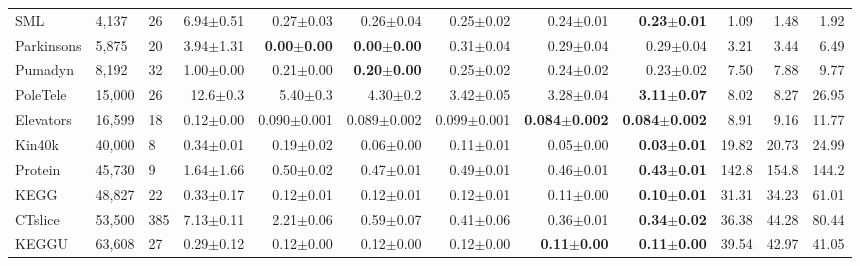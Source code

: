 \documentclass[twoside,11pt]{article}
\begin{document}
\begin{table*}[tbhp]
\begin{tabular}{@{}L{42pt}  R{40pt}  R{20pt}  r  r  r  r  r  r r r r}
    SML & 4,137 & 26  & 6.94$\pm$0.51 & 0.27$\pm$0.03 & 0.26$\pm$0.04 &
                    0.25$\pm$0.02 & 0.24$\pm$0.01 & {\bf 0.23$\pm$0.01} &
                    1.09 & 1.48 & 1.92 \\

    Parkinsons & 5,875 & 20 & 3.94$\pm$1.31 & {\bf 0.00$\pm$0.00} & {\bf 0.00$\pm$0.00} &
                          0.31$\pm$0.04 & 0.29$\pm$0.04 & 0.29$\pm$0.04 &
                          3.21 & 3.44 & 6.49 \\

    Pumadyn & 8,192 & 32 & 1.00$\pm$0.00 & 0.21$\pm$0.00 & {\bf 0.20$\pm$0.00} &
                        0.25$\pm$0.02 & 0.24$\pm$0.02 & 0.23$\pm$0.02 &
                        7.50 & 7.88 & 9.77 \\

    PoleTele & 15,000 & 26 & 12.6$\pm$0.3 & 5.40$\pm$0.3 & 4.30$\pm$0.2 &
                             3.42$\pm$0.05 &  3.28$\pm$0.04 & {\bf 3.11$\pm$0.07} &
                              8.02 & 8.27 & 26.95 \\

    Elevators  &  16,599 & 18 & 0.12$\pm$0.00 & 0.090$\pm$0.001 & 0.089$\pm$0.002 &
                              0.099$\pm$0.001 & {\bf 0.084$\pm$0.002} & {\bf 0.084$\pm$0.002} &
                              8.91 & 9.16 & 11.77 \\

    Kin40k & 40,000 & 8  & 0.34$\pm$0.01 & 0.19$\pm$0.02 & 0.06$\pm$0.00 &
                         0.11$\pm$0.01 & 0.05$\pm$0.00 & {\bf 0.03$\pm$0.01} &
                         19.82 & 20.73 & 24.99 \\

    Protein & 45,730 & 9 & 1.64$\pm$1.66 & 0.50$\pm$0.02 & 0.47$\pm$0.01 &
                         0.49$\pm$0.01 & 0.46$\pm$0.01 & {\bf 0.43$\pm$0.01} &
                         142.8 & 154.8 & 144.2 \\

    KEGG & 48,827 & 22  & 0.33$\pm$0.17 & 0.12$\pm$0.01 & 0.12$\pm$0.01 &
                         0.12$\pm$0.01 & 0.11$\pm$0.00 & {\bf 0.10$\pm$0.01} &
                         31.31 & 34.23 & 61.01 \\

    CTslice & 53,500 & 385 & 7.13$\pm$0.11 & 2.21$\pm$0.06 & 0.59$\pm$0.07 &
                           0.41$\pm$0.06 & 0.36$\pm$0.01 & {\bf 0.34$\pm$0.02} &
                           36.38 & 44.28 & 80.44 \\

    KEGGU & 63,608 & 27 & 0.29$\pm$0.12 & 0.12$\pm$0.00 & 0.12$\pm$0.00 &
                           0.12$\pm$0.00 & {\bf 0.11$\pm$0.00} & {\bf 0.11$\pm$0.00} &
                           39.54 & 42.97 & 41.05 \\


\end{tabular}
\end{table*}
\end{document}

